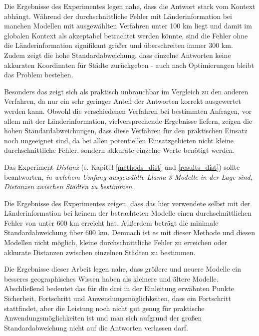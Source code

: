 Die Ergebnisse des Experimentes legen nahe, dass die Antwort stark vom Kontext abhängt.
Während der durchschnittliche Fehler mit Länderinformation bei manchen Modellen mit ausgewählten Verfahren unter 100 km liegt und damit im globalen Kontext als akzeptabel betrachtet werden könnte, sind die Fehler ohne die Länderinformation signifikant größer und überschreiten immer 300 km.
Zudem zeigt die hohe Standardabweichung, dass einzelne Antworten keine akkuraten Koordinaten für Städte zurückgeben - auch nach Optimierungen bleibt das Problem bestehen.

Besonders das \regexv{} zeigt sich als praktisch unbrauchbar im Vergleich zu den anderen Verfahren, da nur ein sehr geringer Anteil der Antworten korrekt ausgewertet werden kann.
Obwohl die verschiedenen Verfahren bei bestimmten Anfragen, vor allem mit der Länderinformation, vielversprechende Ergebnisse liefern, zeigen die hohen Standardabweichungen, dass diese Verfahren für den praktischen Einsatz noch ungeeignet sind, da bei allen potentiellen Einsatzgebieten nicht kleine durchschnittliche Fehler, sondern akkurate einzelne Werte benötigt werden.

Das Experiment \textit{Distanz} (s. Kapitel \ref{methods_dist} und \ref{results_dist}) sollte beantworten, \textit{in welchem Umfang ausgewählte Llama 3 Modelle in der Lage sind, Distanzen zwischen Städten zu bestimmen}.

Die Ergebnisse des Experimentes zeigen, dass das hier verwendete \jsonv{} selbst mit der Länderinformation bei keinem der betrachteten Modelle einen durchschnittlichen Fehler von unter 600 km erreicht hat.
Außerdem beträgt die minimale Standardabweichung über 600 km.
Demnach ist es mit dieser Methode und diesen Modellen nicht möglich, kleine durchschnittliche Fehler zu erreichen oder akkurate Distanzen zwischen einzelnen Städten zu bestimmen.



Die Ergebnisse dieser Arbeit legen nahe, dass größere und neuere Modelle ein besseres geographisches Wissen haben als kleinere und ältere Modelle.
Abschließend bedeutet das für die drei in der Einleitung erwähnten Punkte Sicherheit, Fortschritt und Anwendungsmöglichkeiten, dass ein Fortschritt stattfindet, aber die Leistung noch nicht gut genug für praktische Anwendungsmöglichkeiten ist und man sich aufgrund der großen Standardabweichung nicht auf die Antworten verlassen darf.

